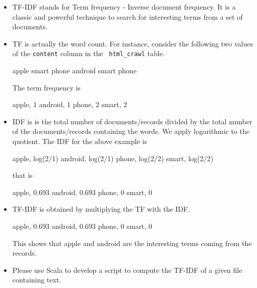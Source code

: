 \documentclass[10pt]{article}
\begin{document}
\begin{itemize}
 \item TF-IDF stands for Term frequency - Inverse document
   frequency. It is a classic and powerful technique to search for
   interesting terms from a set of documents.
 \item TF is actually the word count. For instance, consider the
   following two values of the {\tt content} column in the {\tt
     html\_crawl} table.
   \begin{code}
      apple smart phone
      android smart phone
   \end{code}
   The term frequency is 
   \begin{code}
     apple, 1
     android, 1
     phone, 2
     smart, 2
   \end{code}
 \item IDF is is the total number of documents/records divided by the
   total number of the documents/records containing the words. We
   apply logarithmic to the quotient.
  The IDF for the above example is 
 \begin{code}
    apple, log(2/1) 
    android, log(2/1)
    phone, log(2/2)
    smart, log(2/2) 
  \end{code}
   that is 
 \begin{code}
    apple, 0.693
    android, 0.693
    phone, 0
    smart, 0
  \end{code}
  \item TF-IDF is obtained by multiplying the TF with the IDF.
 \begin{code}
    apple, 0.693
    android, 0.693
    phone, 0
    smart, 0
  \end{code}
  This shows that apple and android are the interesting terms coming
  from the records.
 \item Please use Scala to develop a script to compute the
   TF-IDF of a given file containing text.
\end{itemize}
\end{document}
